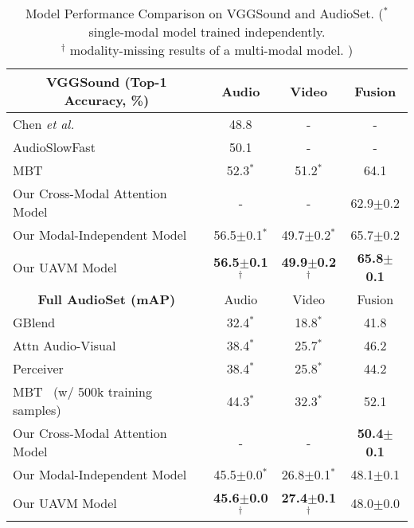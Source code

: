 \documentclass[journal]{IEEEtran}
\begin{document}
\begin{table}[t]
\scriptsize
\centering
\caption{Model Performance Comparison on VGGSound and AudioSet. ($^\ast$ single-modal model trained independently. \\$^\dagger$ modality-missing results of a multi-modal model. )}
\vspace{-1.0em}
\label{tab:main_res}
\begin{tabular}{@{}lccc@{}}
\toprule
\multicolumn{1}{c}{\textbf{VGGSound (Top-1 Accuracy, \%)}}        & Audio & Video & Fusion \\ \midrule
Chen \emph{et al.}~\cite{chen2020vggsound}& 48.8                      & -                         & -         \\
AudioSlowFast~\cite{kazakos2021slow}& 50.1                      & -                         & -               \\
MBT~\cite{nagrani2021attention}     & 52.3$^\ast$   & 51.2$^\ast$             & 64.1                       \\ \midrule
Our Cross-Modal Attention Model & -                         & -                         & 62.9$\pm$0.2         \\
Our Modal-Independent Model & 56.5$\pm$0.1$^\ast$              & 49.7$\pm$0.2$^\ast$              & 65.7$\pm$0.2             \\
Our UAVM Model         & \textbf{56.5$\pm$0.1}$^\dagger$   & \textbf{49.9$\pm$0.2}$^\dagger$              & \textbf{65.8$\pm$0.1}    \\ \midrule\midrule
\multicolumn{1}{c}{\textbf{Full AudioSet (mAP)}} & Audio & Video & Fusion \\ \midrule
GBlend~\cite{wang2020makes} & 32.4$^\ast$                     & 18.8$^\ast$                     & 41.8                     \\
Attn Audio-Visual~\cite{fayek2021large} & 38.4$^\ast$         & 25.7$^\ast$                     & 46.2                     \\
Perceiver~\cite{jaegle2021perceiver} & 38.4$^\ast$                     & 25.8$^\ast$                     & 44.2            \\
MBT~\cite{nagrani2021attention} (w/ 500k training samples) & 44.3$^\ast$                     & 32.3$^\ast$                      & 52.1                       \\ \midrule
Our Cross-Modal Attention Model & -                     & -                         & \textbf{50.4$\pm$0.1} \\
Our Modal-Independent Model     & 45.5$\pm$0.0$^\ast$          & 26.8$\pm$0.1$^\ast$              & 48.1$\pm$0.1        \\
Our UAVM Model                    & \textbf{45.6$\pm$0.0}$^\dagger$ & \textbf{27.4$\pm$0.1}$^\dagger$     & 48.0$\pm$0.0        \\ \bottomrule
\end{tabular}
\vspace{-2.5em}
\end{table}
\end{document}
